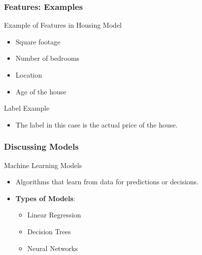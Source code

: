 \documentclass[aspectratio=169]{beamer}
\begin{document}
\begin{frame}[fragile]
    \frametitle{Features: Examples}
    \begin{block}{Example of Features in Housing Model}
        \begin{itemize}
            \item Square footage
            \item Number of bedrooms
            \item Location
            \item Age of the house
        \end{itemize}
    \end{block}
    
    \begin{block}{Label Example}
        \begin{itemize}
            \item The label in this case is the actual price of the house.
        \end{itemize}
    \end{block}
\end{frame}

\begin{frame}[fragile]
    \frametitle{Discussing Models}
    \begin{block}{Machine Learning Models}
        \begin{itemize}
            \item Algorithms that learn from data for predictions or decisions.
            \item \textbf{Types of Models}:
            \begin{itemize}
                \item Linear Regression
                \item Decision Trees
                \item Neural Networks
            \end{itemize}
        \end{itemize}
    \end{block}
\end{frame}
\end{document}

